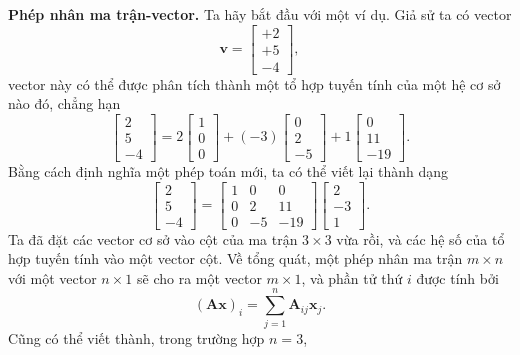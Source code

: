 \textbf{Phép nhân ma trận-vector.} Ta hãy bắt đầu với một ví dụ. Giả sử ta có vector \[\mathbf{v}=\begin{bmatrix}
    +2\\+5\\-4
\end{bmatrix},\] vector này có thể được phân tích thành một tổ hợp tuyến tính của một hệ cơ sở nào đó, chẳng hạn
\[\begin{bmatrix}
    2\\5\\-4
\end{bmatrix}=2\begin{bmatrix}
    1\\0\\0
\end{bmatrix}+(-3)\begin{bmatrix}
    0\\2\\-5
\end{bmatrix}+1\begin{bmatrix}
    0\\11\\-19
\end{bmatrix}.\]
Bằng cách định nghĩa một phép toán mới, ta có thể viết lại thành dạng
\begin{equation}\label{eq2.2.1}
    \begin{bmatrix}
    2\\5\\-4
\end{bmatrix}=\begin{bmatrix}
    1&0&0\\
    0&2&11\\
    0&-5&-19
\end{bmatrix}\begin{bmatrix}
    2\\-3\\1
\end{bmatrix}.\end{equation} Ta đã đặt các vector cơ sở vào cột của ma trận \(3\times 3\) vừa rồi, và các hệ số của tổ hợp tuyến tính vào một vector cột. Về tổng quát, một phép nhân ma trận \(m\times n\) với một vector \(n\times 1\) sẽ cho ra một vector \(m\times 1\), và phần tử thứ \(i\) được tính bởi 
\begin{equation}
    (\mathbf{Ax})_i = \sum_{j=1}^n \mathbf{A}_{ij}\mathbf{x}_j.
\end{equation}
Cũng có thể viết thành, trong trường hợp \(n=3\),
